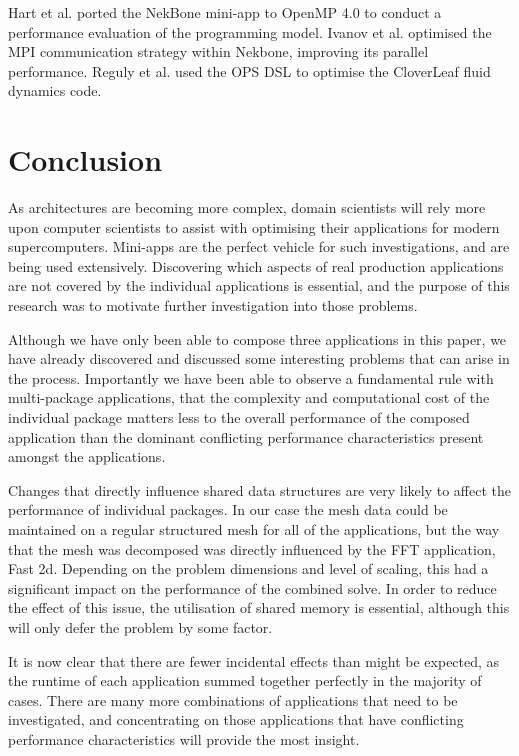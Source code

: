 \documentclass[runningheads,a4paper]{llncs}
\begin{document}
Hart et al. \cite{Hart2015} ported the NekBone mini-app to OpenMP 4.0 to conduct a performance evaluation of the programming model. Ivanov et al. \cite{Ivanov2015} optimised the MPI communication strategy within Nekbone, improving its parallel performance. Reguly et al. \cite{Reguly2014} used the OPS DSL to optimise the CloverLeaf fluid dynamics code.

\section{Conclusion}

As architectures are becoming more complex, domain scientists will rely more upon computer scientists to assist with optimising their applications for modern supercomputers. Mini-apps are the perfect vehicle for such investigations, and are being used extensively. Discovering which aspects of real production applications are not covered by the individual applications is essential, and the purpose of this research was to motivate further investigation into those problems.

Although we have only been able to compose three applications in this paper, we have already discovered and discussed some interesting problems that can arise in the process. Importantly we have been able to observe a fundamental rule with multi-package applications, that the complexity and computational cost of the individual package matters less to the overall performance of the composed application than the dominant conflicting performance characteristics present amongst the applications.

Changes that directly influence shared data structures are very likely to affect the performance of individual packages. In our case the mesh data could be maintained on a regular structured mesh for all of the applications, but the way that the mesh was decomposed was directly influenced by the FFT application, Fast 2d. Depending on the problem dimensions and level of scaling, this had a significant impact on the performance of the combined solve. In order to reduce the effect of this issue, the utilisation of shared memory is essential, although this will only defer the problem by some factor.

It is now clear that there are fewer incidental effects than might be expected, as the runtime of each application summed together perfectly in the majority of cases. There are many more combinations of applications that need to be investigated, and concentrating on those applications that have conflicting performance characteristics will provide the most insight.



\end{document}
